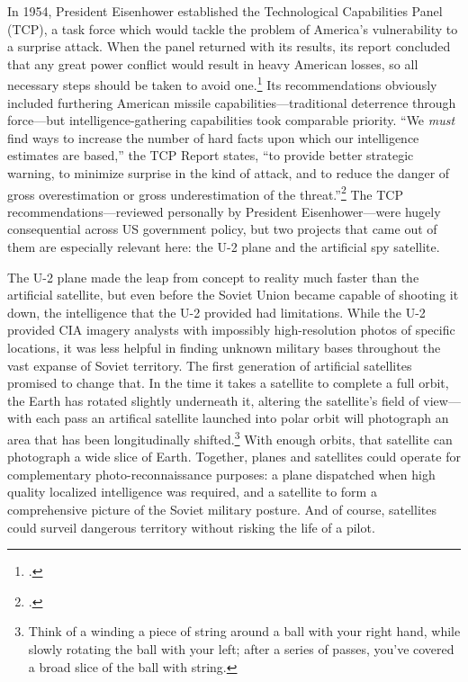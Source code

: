 \documentclass[14pt]{extarticle}
\begin{document}
In 1954, President Eisenhower established the Technological Capabilities Panel (TCP), a task force which would tackle the problem of America's vulnerability to a surprise attack. When the panel returned with its results, its report concluded that any great power conflict would result in heavy American losses, so all necessary steps should be taken to avoid one.\footcite[p.~67. The TCP report is also variously referred to as the \enquote{Killian Report,} \enquote{Surprise Attack Study,} or its formal title, \enquote{Meeting the Threat of a Surprise Attack.}]{killian_sputnik_1977} Its recommendations obviously included furthering American missile capabilities---traditional deterrence through force---but intelligence-gathering capabilities took comparable priority. ``We \emph{must} find ways to increase the number of hard facts upon which our intelligence estimates are based,'' the TCP Report states, ``to provide better strategic warning, to minimize surprise in the kind of attack, and to reduce the danger of gross overestimation or gross underestimation of the threat.''\footcite{technological_capabilities_panel_meeting_1955} The TCP recommendations---reviewed personally by President Eisenhower---were hugely consequential across US government policy, but two projects that came out of them are especially relevant here: the U-2 plane and the artificial spy satellite.

The U-2 plane made the leap from concept to reality much faster than the artificial satellite, but even before the Soviet Union became capable of shooting it down, the intelligence that the U-2 provided had limitations. While the U-2 provided CIA imagery analysts with impossibly high-resolution photos of specific locations, it was less helpful in finding unknown military bases throughout the vast expanse of Soviet territory. The first generation of artificial satellites promised to change that. In the time it takes a satellite to complete a full orbit, the Earth has rotated slightly underneath it, altering the satellite's field of view---with each pass an artifical satellite launched into polar orbit will photograph an area that has been longitudinally shifted.\footnote{Think of a winding a piece of string around a ball with your right hand, while slowly rotating the ball with your left; after a series of passes, you've covered a broad slice of the ball with string.} With enough orbits, that satellite can photograph a wide slice of Earth. Together, planes and satellites could operate for complementary photo-reconnaissance purposes: a plane dispatched when high quality localized intelligence was required, and a satellite to form a comprehensive picture of the Soviet military posture. And of course, satellites could surveil dangerous territory without risking the life of a pilot.
\end{document}
